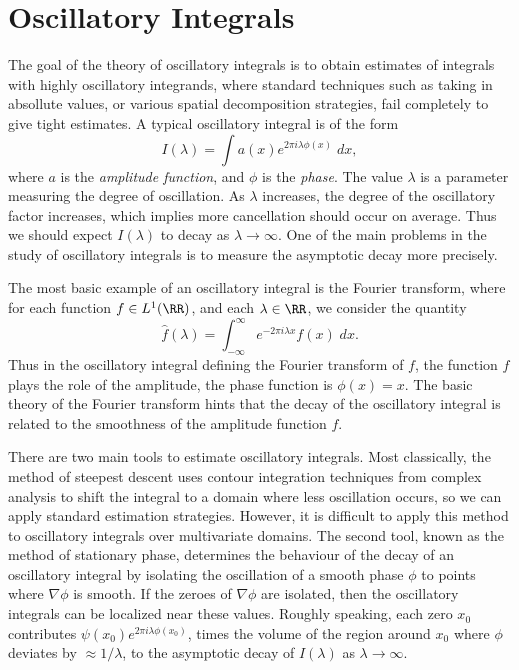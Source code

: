 \chapter{Oscillatory Integrals}

The goal of the theory of oscillatory integrals is to obtain estimates of integrals with highly oscillatory integrands, where standard techniques such as taking in absollute values, or various spatial decomposition strategies, fail completely to give tight estimates. A typical oscillatory integral is of the form
%
\[ I(\lambda) = \int a(x) e^{2 \pi i \lambda \phi(x)}\; dx, \]
%
where $a$ is the \emph{amplitude function}, and $\phi$ is the \emph{phase}. The value $\lambda$ is a parameter measuring the degree of oscillation. As $\lambda$ increases, the degree of the oscillatory factor increases, which implies more cancellation should occur on average. Thus we should expect $I(\lambda)$ to decay as $\lambda \to \infty$. One of the main problems in the study of oscillatory integrals is to measure the asymptotic decay more precisely.

\begin{example}
    The most basic example of an oscillatory integral is the Fourier transform, where for each function $f \in L^1(\RR)$, and each $\lambda \in \RR$, we consider the quantity
    \[ \widehat{f}(\lambda) = \int_{-\infty}^\infty e^{- 2 \pi i \lambda x} f(x)\; dx. \]
    Thus in the oscillatory integral defining the Fourier transform of $f$, the function $f$ plays the role of the amplitude, the phase function is $\phi(x) = x$. The basic theory of the Fourier transform hints that the decay of the oscillatory integral is related to the smoothness of the amplitude function $f$.
\end{example}

There are two main tools to estimate oscillatory integrals. Most classically, the method of steepest descent uses contour integration techniques from complex analysis to shift the integral to a domain where less oscillation occurs, so we can apply standard estimation strategies. However, it is difficult to apply this method to oscillatory integrals over multivariate domains. The second tool, known as the method of stationary phase, determines the behaviour of the decay of an oscillatory integral by isolating the oscillation of a smooth phase $\phi$ to points where $\nabla \phi$ is smooth. If the zeroes of $\nabla \phi$ are isolated, then the oscillatory integrals can be localized near these values. Roughly speaking, each zero $x_0$ contributes $\psi(x_0) e^{2 \pi i \lambda \phi(x_0)}$, times the volume of the region around $x_0$ where $\phi$ deviates by $\approx 1/\lambda$, to the asymptotic decay of $I(\lambda)$ as $\lambda \to \infty$.

